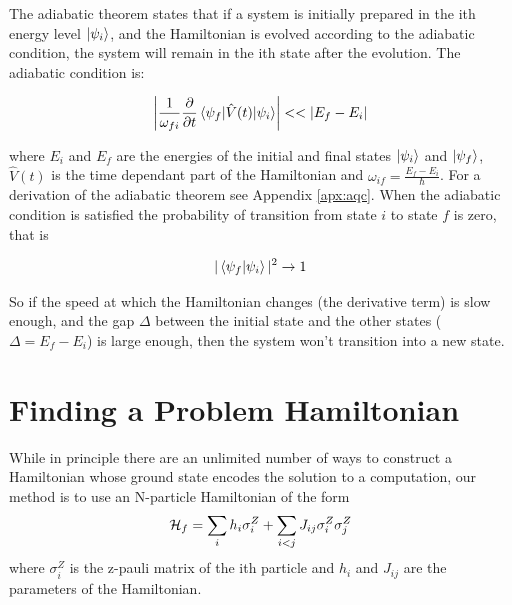 The adiabatic theorem states that if a system is initially prepared in the ith energy level $\mathinner{|{\psi_i}\rangle}$, and the Hamiltonian is evolved according to the adiabatic condition, the system will remain in the ith state after the evolution.  The adiabatic condition is:

\begin{equation}
	\left | \frac{1}{\omega_{fi}}\frac{\partial}{\partial t} \mathinner{\langle{\psi_f | \hat{V}(t) | \psi_i}\rangle} \right | << |E_f - E_i|
\end{equation}

where $E_i$ and $E_f$ are the energies of the initial and final states $\mathinner{|{\psi_i}\rangle}$ and $\mathinner{|{\psi_f}\rangle}$, $\hat{V}(t)$ is the time dependant part of the Hamiltonian and $\omega_{if} = \frac{E_f - E_i}{\hbar}$.  For a derivation of the adiabatic theorem see Appendix \ref{apx:aqc}.\cite{zettili}  When the adiabatic condition is satisfied the probability of transition from state $i$ to state $f$ is zero, that is

\begin{equation}
	|\mathinner{\langle{\psi_f|\psi_i}\rangle}|^2 \rightarrow 1
\end{equation}

So if the speed at which the Hamiltonian changes (the derivative term) is slow enough, and the gap $\Delta$ between the initial state and the other states ($\Delta = E_f - E_i$) is large enough, then the system won't transition into a new state.  

\section{Finding a Problem Hamiltonian}
\label{sec:prob_ham}
While in principle there are an unlimited number of ways to construct a Hamiltonian whose ground state encodes the solution to a computation, our method is to use an N-particle Hamiltonian of the form
\begin{equation}
	\label{eq:ham}
	\mathcal{H}_f = \sum_i h_i \sigma_i^Z + \sum_{i < j} J_{ij} \sigma_i^Z\sigma_j^Z 
\end{equation}
where $\sigma_i^Z$ is the z-pauli matrix of the ith particle and $h_i$ and $J_{ij}$ are the parameters of the Hamiltonian.  



